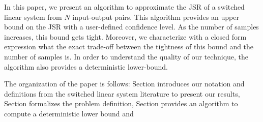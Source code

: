 \documentclass[letterpaper, 10 pt, conference]{ieeeconf}  %
\newcommand{\R}{\mathbb{R} }
\newcommand{\N}{\mathbb{N} }
\begin{document}
In this paper, we present an algorithm to approximate the JSR of a switched linear system from $N$ input-output pairs. This algorithm provides an upper bound on the JSR with a user-defined confidence level. As the number of samples increases, this bound gets tight. Moreover, we characterize with a closed form expression what the exact trade-off between the tightness of this bound and the number of samples is. In order to understand the quality of our technique, the algorithm also provides a deterministic lower-bound.

The organization of the paper is follows: Section \label{preliminaries} introduces our notation and definitions from the switched linear system literature to present our results, Section \label{problemDefinition} formalizes the problem definition, Section \label{upperBound} provides an algorithm to compute a deterministic lower bound and 
%
%


\end{document}
